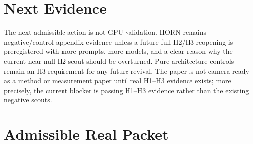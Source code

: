 \documentclass{article}
\begin{document}
\section{Next Evidence}

The next admissible action is not GPU validation. HORN remains negative/control
appendix evidence unless a future full H2/H3 reopening is
preregistered with more prompts, more models, and a clear reason why the current
near-null H2 scout should be overturned. Pure-architecture controls remain an
H3 requirement for any future revival.
The paper is not camera-ready as a method or measurement paper until real H1--H3 evidence exists; more precisely, the current blocker is passing H1--H3 evidence rather than the existing negative scouts.

\section{Admissible Real Packet}
\end{document}
